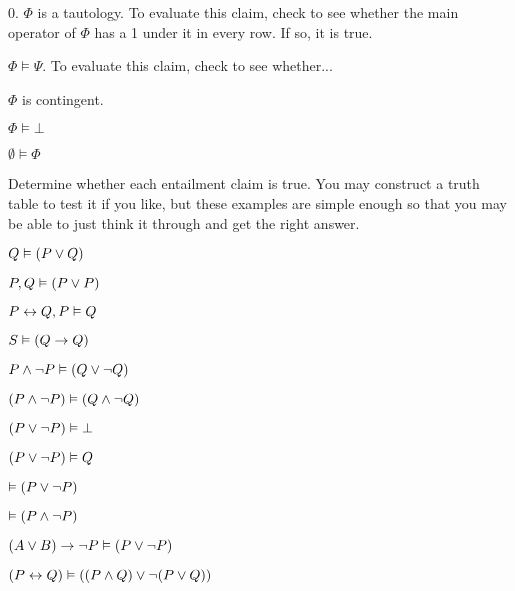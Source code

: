 \begin{earg}
		\item[0.] $\Phi$ is a tautology.
		To evaluate this claim, check to see whether the main operator of $\Phi$ has a 1 under it in every row. If so, it is true.
		\item $\Phi \models \Psi$. 
		To evaluate this claim, check to see whether... 
		
		\item $\Phi$ is contingent.
\item $\Phi \models \bot$
		\item $\emptyset \models \Phi$
	\end{earg}


\problempart
Determine whether each entailment claim is true. You may construct a truth table to test it if you like, but these examples are simple enough so that you may be able to just think it through and get the right answer.
\begin{earg}
\item $Q \vDash (P \vee Q)$
\item $P, Q \vDash (P \vee P)$
\item $P \leftrightarrow Q, P \vDash Q$ %
\item $S \vDash (Q \rightarrow Q)$   %
\item $P \wedge \neg P \vDash (Q \vee \neg Q)$%
\item $(P \wedge \neg P) \vDash (Q \wedge \neg Q)$
\item $(P \vee \neg P) \vDash \bot$
\item $(P \vee \neg P) \vDash Q$%
\item $\vDash (P \vee \neg P)$
\item $\vDash (P \wedge \neg P)$
\item $(A \vee B) \rightarrow \neg P \vDash (P \vee \neg P)$
\item $(P \leftrightarrow Q) \vDash ((P \wedge Q) \vee \neg (P \vee Q))$
\end{earg}

\fi 

